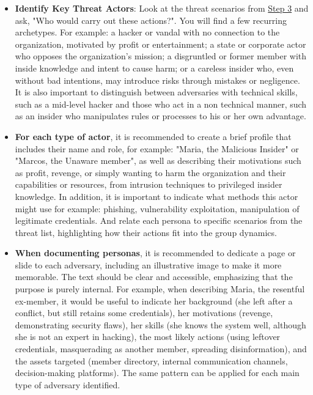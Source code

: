 \begin{itemize}
    \item \textbf{Identify Key Threat Actors}: Look at the threat scenarios from \hyperref[subsec:Step3]{Step 3}
    and ask, "Who would carry out these actions?". You will find a few recurring archetypes. For example:
    a hacker or vandal with no connection to the organization, motivated by profit or
    entertainment; a state or corporate actor who opposes the organization's
    mission; a disgruntled or former member with inside knowledge and intent to
    cause harm; or a careless insider who, even without bad intentions, may
    introduce risks through mistakes or negligence. It is also important to
    distinguish between adversaries with technical skills, such as a mid-level
    hacker and those who act in a non technical manner, such as an insider who
    manipulates rules or processes to his or her own advantage.

    \item \textbf{For each type of actor}, it is recommended to create a brief profile that
    includes their name and role, for example: "Maria, the Malicious Insider" or "Marcos,
    the Unaware member", as well as describing their motivations such as profit,
    revenge, or simply wanting to harm the organization and their capabilities or
    resources, from intrusion techniques to privileged insider knowledge. In
    addition, it is important to indicate what methods this actor might use for example:
    phishing, vulnerability exploitation, manipulation of legitimate credentials.
    And relate each persona to specific scenarios from the threat list, highlighting
    how their actions fit into the group dynamics.

    \item \textbf{When documenting personas}, it is recommended to dedicate a page or slide to each
    adversary, including an illustrative image to make it more memorable. The text should be clear
    and accessible, emphasizing that the purpose is purely internal. For example, when
    describing Maria, the resentful ex-member, it would be useful to indicate her
    background (she left after a conflict, but still retains some credentials), her
    motivations (revenge, demonstrating security flaws), her skills (she knows the
    system well, although she is not an expert in hacking), the most likely actions
    (using leftover credentials, masquerading as another member, spreading
    disinformation), and the assets targeted (member directory, internal
    communication channels, decision-making platforms). The same pattern can be
    applied for each main type of adversary identified.
    

\end{itemize}
